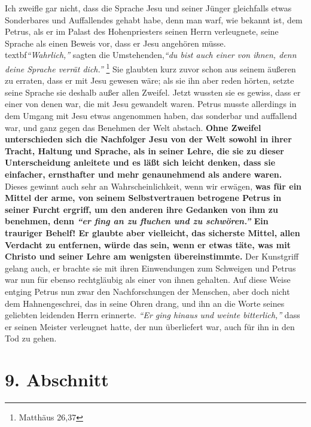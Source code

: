 Ich zweifle gar nicht, dass die Sprache Jesu
und seiner Jünger gleichfalls etwas
Sonderbares und Auffallendes gehabt habe, denn man warf, wie bekannt ist, dem
Petrus, als er im Palast des Hohenpriesters
seinen Herrn verleugnete, seine
Sprache als einen Beweis vor, dass er Jesu angehören müsse.
\\textbf{\textit{"`Wahrlich,"'} sagten
die Umstehenden,}\textit{"`du bist auch einer von ihnen, denn deine Sprache
verrät
dich."'}
\footnote{Matthäus 26,37}
Sie glaubten kurz zuvor schon aus seinem äußeren
zu erraten, dass er mit Jesu gewesen wäre; als sie ihn aber reden hörten, setzte
seine Sprache sie deshalb außer allen Zweifel. Jetzt wussten sie es gewiss, dass er
einer von denen war, die mit Jesu gewandelt waren. Petrus musste allerdings in
dem Umgang mit Jesu etwas angenommen haben, das sonderbar und auffallend war,
und ganz gegen das Benehmen der Welt abstach. \label{ref:10_08_sprache}
\textbf{Ohne Zweifel unterschieden sich
die  Nachfolger Jesu von der Welt sowohl in ihrer
Tracht, Haltung und Sprache,
als in seiner Lehre, die sie zu dieser Unterscheidung anleitete und es läßt sich
leicht denken, dass sie einfacher,
ernsthafter und mehr genaunehmend als andere
waren.} Dieses gewinnt auch sehr an Wahrscheinlichkeit, wenn wir erwägen,
\textbf{was für
ein Mittel der arme, von seinem Selbstvertrauen betrogene Petrus in seiner
Furcht ergriff, um den anderen ihre Gedanken von ihm zu benehmen, denn
\textit{"`er fing
an zu fluchen und zu schwören."'} Ein trauriger Behelf! Er glaubte aber
vielleicht, das sicherste Mittel, allen Verdacht zu entfernen, würde das sein,
wenn er etwas täte, was mit Christo und seiner Lehre am wenigsten
übereinstimmte.} Der Kunstgriff gelang auch, er brachte sie mit ihren
Einwendungen zum Schweigen und Petrus war nun für ebenso
rechtgläubig als
einer von ihnen gehalten. Auf diese Weise entging Petrus nun zwar den
Nachforschungen der Menschen, aber doch nicht dem Hahnengeschrei, das in seine
Ohren drang, und ihn an die Worte seines geliebten leidenden Herrn erinnerte.
\textit{"`Er ging hinaus und weinte bitterlich,"'} dass er seinen Meister
verleugnet
hatte, der nun überliefert war, auch für ihn in den Tod zu gehen.

\section{9. Abschnitt} \label{kap10_ab9}

